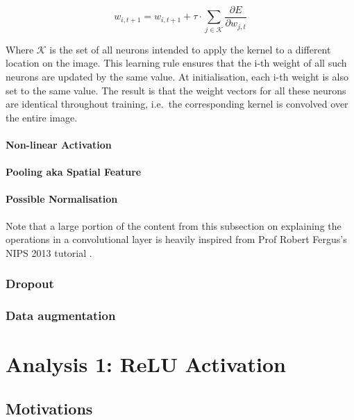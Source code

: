 \documentclass[a4paper,11pt]{article}
\begin{document}
\begin{equation}
 w_{i,t+1} = w_{i,t+1} + \tau \cdot \sum_{j \in \mathcal{K}}	\frac{\partial{E}}{\partial{w_{j,t}}}
\label{eqn:conv_learning_rule}
\end{equation}

Where $\mathcal{K}$ is the set of all neurons intended to apply the kernel to a different location on the image. This learning rule ensures that the i-th weight of all such neurons are updated by the same value. At initialisation, each i-th weight is also set to the same value. The result is that the weight vectors for all these neurons are identical throughout training, i.e.\ the corresponding kernel is convolved over the entire image. \\

 
\paragraph{Non-linear Activation}

\paragraph{Pooling aka Spatial Feature}

\paragraph{Possible Normalisation}

Note that a large portion of the content from this subsection on explaining the operations in a convolutional layer is heavily inspired from Prof Robert Fergus's NIPS 2013 tutorial \cite{fergus_tutorial}.

\subsubsection{Dropout}

\subsubsection{Data augmentation}


\clearpage

\section{Analysis 1: ReLU Activation}

\subsection{Motivations}
\end{document}
